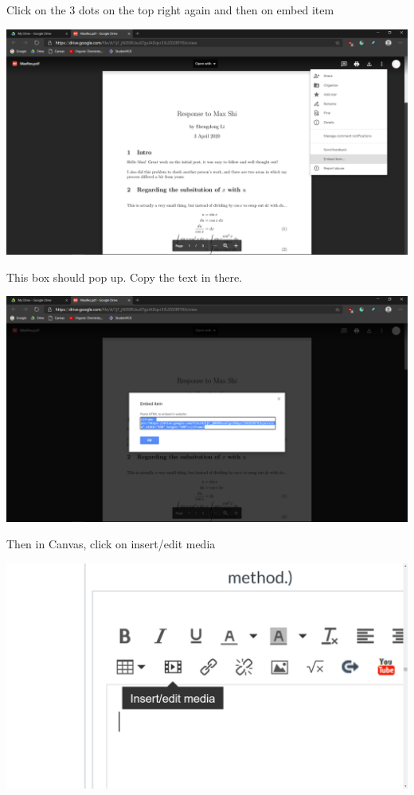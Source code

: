 \documentclass[letterpaper, 12pt]{article}
\begin{document}
Click on the 3 dots on the top right again and then on embed item
\begin{center}
    \includegraphics[scale=0.3]{4.png}
\end{center}
This box should pop up. Copy the text in there.
\begin{center}
    \includegraphics[scale=0.3]{5.png}
\end{center}
Then in Canvas, click on insert/edit media
\begin{center}
    \includegraphics[scale=0.3]{6.png}
\end{center}
\end{document}
